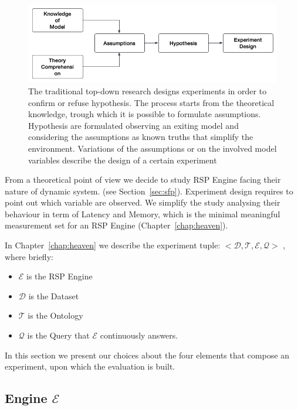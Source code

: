 \begin{figure}[tbh]
  \centering
	\includegraphics[width=\linewidth]{images/experiment-design}
	\caption[Experiment Design Process]{The traditional top-down research designs experiments in order to confirm or refuse hypothesis. The process starts from the theoretical knowledge, trough which it is possible to formulate assumptions. Hypothesis are formulated observing an exiting model and considering the assumptions as known truths that simplify the environment. Variations of the assumptions or on the involved model variables describe the design of a certain experiment}
  	\label{fig:experiment-design}
\end{figure}

From a theoretical point of view we decide to study RSP Engine facing their nature of dynamic system. (see Section~\ref{sec:sfp}). Experiment design requires to point out which variable are observed. We simplify the study analysing their behaviour in term of Latency and Memory, which is the minimal meaningful measurement set for an RSP Engine (Chapter~\ref{chap:heaven}).

In Chapter~\ref{chap:heaven} we describe the experiment tuple: $<\mathcal{D}, \mathcal{T},\mathcal{E}, \mathcal{Q}>$ , where briefly:
\begin{itemize}
\item $\mathcal{E}$ is the RSP Engine
\item $\mathcal{D}$ is the Dataset 
\item $\mathcal{T}$ is the Ontology
\item $\mathcal{Q}$ is the Query that $\mathcal{E}$ continuously answers.
\end{itemize}

In this section we present our choices about the four elements that compose an experiment, upon which the evaluation is built.

\pagebreak

\subsection{Engine $\mathcal{E}$}

